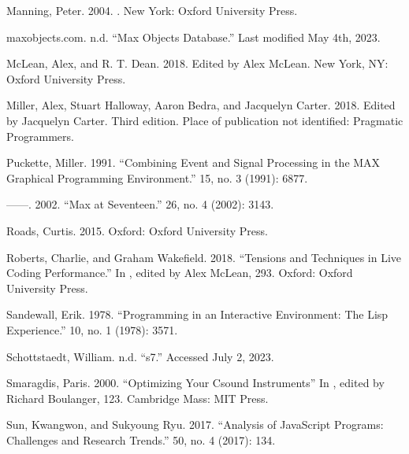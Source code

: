\documentclass[letterpaper,10pt,english]{sphinxmanual}
\begin{document}
\sphinxAtStartPar
Manning, Peter. 2004. . New York: Oxford University Press.

\sphinxAtStartPar
maxobjects.com. n.d. “Max Objects Database.” Last modified May 4th, 2023. 

\sphinxAtStartPar
McLean, Alex, and R. T. Dean. 2018.  Edited by Alex McLean. New York, NY: Oxford University Press.

\sphinxAtStartPar
Miller, Alex, Stuart Halloway, Aaron Bedra, and Jacquelyn Carter. 2018.  Edited by Jacquelyn Carter. Third edition. Place of publication not identified: Pragmatic Programmers.

\sphinxAtStartPar
Puckette, Miller. 1991. “Combining Event and Signal Processing in the MAX Graphical Programming Environment.”  15, no. 3 (1991): 68\textendash{}77.

\sphinxAtStartPar
——. 2002. “Max at Seventeen.”  26, no. 4 (2002): 31\textendash{}43.

\sphinxAtStartPar
Roads, Curtis. 2015.  Oxford: Oxford University Press.

\sphinxAtStartPar
Roberts, Charlie, and Graham Wakefield. 2018. “Tensions and Techniques in Live Coding Performance.” In , edited by Alex McLean, 293. Oxford: Oxford University Press.

\sphinxAtStartPar
Sandewall, Erik. 1978. “Programming in an Interactive Environment: The Lisp Experience.”  10, no. 1 (1978): 35\textendash{}71.

\sphinxAtStartPar
Schottstaedt, William. n.d. “s7.” Accessed July 2, 2023. 

\sphinxAtStartPar
Smaragdis, Paris. 2000. “Optimizing Your Csound Instruments” In , edited by Richard Boulanger, 123. Cambridge Mass: MIT Press.

\sphinxAtStartPar
Sun, Kwangwon, and Sukyoung Ryu. 2017. “Analysis of JavaScript Programs: Challenges and Research Trends.”  50, no. 4 (2017): 1\textendash{}34.
\end{document}
